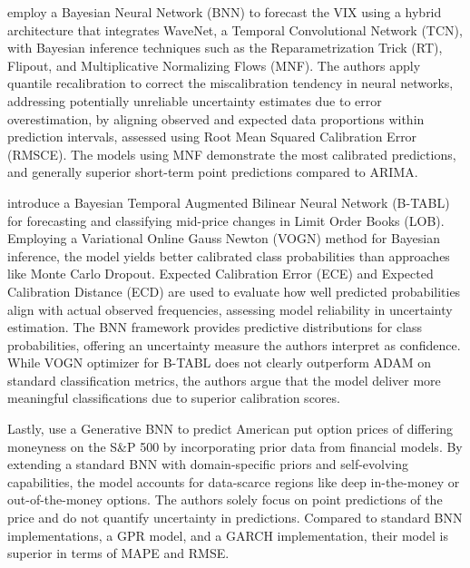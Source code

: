 \textcite{hortua2024forecasting} employ a Bayesian Neural Network (BNN) to forecast the VIX using a hybrid architecture that integrates WaveNet, a Temporal Convolutional Network (TCN), with Bayesian inference techniques such as the Reparametrization Trick (RT), Flipout, and Multiplicative Normalizing Flows (MNF). The authors apply quantile recalibration to correct the miscalibration tendency in neural networks, addressing potentially unreliable uncertainty estimates due to error overestimation, by aligning observed and expected data proportions within prediction intervals, assessed using Root Mean Squared Calibration Error (RMSCE). The models using MNF demonstrate the most calibrated predictions, and generally superior short-term point predictions compared to ARIMA. 

\textcite{magris2023bayesian} introduce a Bayesian Temporal Augmented Bilinear Neural Network (B-TABL) for forecasting and classifying mid-price changes in Limit Order Books (LOB). Employing a Variational Online Gauss Newton (VOGN) method for Bayesian inference, the model yields better calibrated class probabilities than approaches like Monte Carlo Dropout. Expected Calibration Error (ECE) and Expected Calibration Distance (ECD) are used to evaluate how well predicted probabilities align with actual observed frequencies, assessing model reliability in uncertainty estimation. The BNN framework provides predictive distributions for class probabilities, offering an uncertainty measure the authors interpret as confidence. While VOGN optimizer for B-TABL does not clearly outperform ADAM on standard classification metrics, the authors argue that the model deliver more meaningful classifications due to superior calibration scores. 

Lastly, \textcite{jang2018generative} use a Generative BNN to predict American put option prices of differing moneyness on the S\&P 500 by incorporating prior data from financial models. By extending a standard BNN with domain-specific priors and self-evolving capabilities, the model accounts for data-scarce regions like deep in-the-money or out-of-the-money options. The authors solely focus on point predictions of the price and do not quantify uncertainty in predictions. Compared to standard BNN implementations, a GPR model, and a GARCH implementation, their model is superior in terms of MAPE and RMSE.

